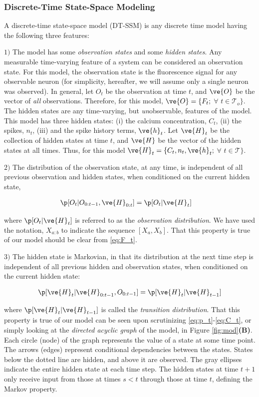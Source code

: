 \subsubsection{Discrete-Time State-Space Modeling}

A discrete-time state-space model (DT-SSM) is any discrete time model having the following three features:

$1)$ The model has some \emph{observation states} and some \emph{hidden states}.  Any measurable time-varying feature of a system can be considered an observation state.  For this model, the observation state is the fluorescence signal for any observable neuron (for simplicity, hereafter, we will assume only a single neuron was observed).  In general, let $O_t$ be the observation at time $t$, and $\ve{O}$ be the vector of \emph{all} observations.  Therefore, for this model, $\ve{O} = \{F_t;$  $\forall$ $t\in\mathcal{T}_o\}$.  The hidden states are any time-varying, but \emph{un}observable, features of the model.  This model has three hidden states: (i) the calcium concentration, $C_t$, (ii) the spikes, $n_t$, (iii) and the spike history terms, $\ve{h}_t$. Let $\ve{H}_t$ be the collection of hidden states at time $t$, and $\ve{H}$ be the vector of the hidden states at all times.  Thus, for this model $\ve{H}_t=\{C_t,n_t,\ve{h}_t; $ $\forall$ $t\in\mathcal{T}\}$.

$2)$ The distribution of the observation state, at any time, is independent of all previous observation and hidden states, when conditioned on the current hidden state,

\begin{align}
\p [O_t | O_{0:t-1}, \ve{H}_{0:t}] & = \p[O_t | \ve{H}_t]
\end{align}

\noindent where $\p[O_t | \ve{H}_t]$ is referred to as the \emph{observation distribution}.  We have used the notation, $X_{a:b}$ to indicate the sequence $[X_a, X_b]$.  That this property is true of our model should be clear from \eqref{eq:F_t}.

$3)$ The hidden state is Markovian, in that its distribution at the next time step is independent of all previous hidden and observation states, when conditioned on the current hidden state:

\begin{align}
\p [\ve{H}_{t} | \ve{H}_{0:t-1}, O_{0:t-1}] = \p[\ve{H}_{t} | \ve{H}_{t-1}]
\end{align}

\noindent where $\p[\ve{H}_t | \ve{H}_{t-1}]$ is called the \emph{transition distribution}.  That this property is true of our model can be seen upon scrutinizing \eqref{eq:p_t}-\eqref{eq:C_t}, or simply looking at the \emph{directed acyclic graph} of the model, in Figure \ref{fig:mod}\textbf{(B)}.  Each circle (node) of the graph represents the value of a state at some time point.  The arrows (edges) represent conditional dependencies between the states.  States below the dotted line are hidden, and above it are observed.  The gray ellipses indicate the entire hidden state at each time step.  The hidden states at time $t+1$ only receive input from those at times $s<t$ through those at time $t$, defining the Markov property.

